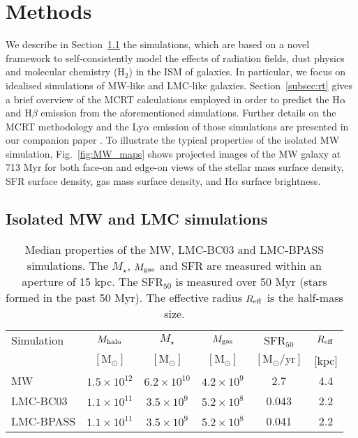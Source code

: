\documentclass[fleqn,usenatbib]{mnras}
\begin{document}
\section{Methods}
\label{sec:methods}

We describe in Section~\ref{subsec:simulation} the simulations, which are based on a novel framework to self-consistently model the effects of radiation fields, dust physics and molecular chemistry (H$_2$) in the ISM of galaxies. In particular, we focus on idealised simulations of MW-like and LMC-like galaxies. Section~\ref{subsec:rt} gives a brief overview of the MCRT calculations employed in order to predict the H$\alpha$ and H$\beta$ emission from the aforementioned simulations. Further details on the MCRT methodology and the Ly$\alpha$ emission of those simulations are presented in our companion paper \citep{smith21_rt}. To illustrate the typical properties of the isolated MW simulation, Fig.~\ref{fig:MW_maps} shows projected images of the MW galaxy at 713 Myr for both face-on and edge-on views of the stellar mass surface density, SFR surface density, gas mass surface density, and H$\alpha$ surface brightness. 

\subsection{Isolated MW and LMC simulations}
\label{subsec:simulation}

\begin{table}
    \setlength{\tabcolsep}{5pt}
    \renewcommand{\arraystretch}{1.5}
    \caption{Median properties of the MW, LMC-BC03 and LMC-BPASS simulations. The $M_{\star}$, $M_{\rm gas}$ and SFR are measured within an aperture of 15 kpc. The SFR$_{50}$ is measured over 50 Myr (stars formed in the past 50 Myr). The effective radius $R_{\rm eff}$ is the half-mass size. }\label{tab:simulation}
    \centering 
        \begin{tabular}{lccccc}
          \hline
          Simulation & $M_{\rm halo}$ & $M_{\star}$ & $M_{\rm gas}$ & SFR$_{50}$ & $R_{\rm eff}$ \\ 
           & $[\text{M}_{\odot}]$ & $[\text{M}_{\odot}]$ & $[\text{M}_{\odot}]$ & $[\text{M}_{\odot}/\mathrm{yr}]$ & [kpc] \\ 
          \hline
          MW  & $1.5\times10^{12}$ & $6.2\times10^{10}$ & $4.2\times10^{9}$ & 2.7 & 4.4 \\ 
          LMC-BC03 & $1.1\times10^{11}$ & $3.5\times10^{9}$ & $5.2\times10^{8}$ & 0.043 & 2.2 \\
          LMC-BPASS & $1.1\times10^{11}$ & $3.5\times10^{9}$ & $5.2\times10^{8}$ & 0.041 & 2.2 \\  \hline
        \end{tabular}
\end{table}
\end{document}
